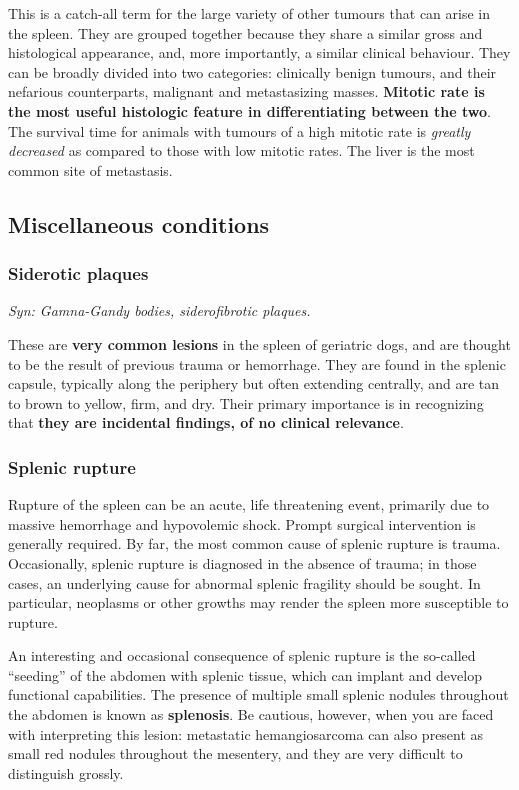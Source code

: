 \documentclass[openany]{article}
\begin{document}
This is a catch-all term for the large variety of other tumours that can
arise in the spleen. They are grouped together because they share a
similar gross and histological appearance, and, more importantly, a
similar clinical behaviour. They can be broadly divided into two
categories: clinically benign tumours, and their nefarious counterparts,
malignant and metastasizing masses. \textbf{Mitotic rate is the most
useful histologic feature in differentiating between the two}. The
survival time for animals with tumours of a high mitotic rate is
\emph{greatly decreased} as compared to those with low mitotic rates.
The liver is the most common site of metastasis.

\subsection{Miscellaneous conditions}\label{miscellaneous-conditions}

\subsubsection{Siderotic plaques}\label{siderotic-plaques}

\emph{Syn: Gamna-Gandy bodies, siderofibrotic plaques.}

These are \textbf{very common lesions} in the spleen of geriatric dogs,
and are thought to be the result of previous trauma or hemorrhage. They
are found in the splenic capsule, typically along the periphery but
often extending centrally, and are tan to brown to yellow, firm, and
dry. Their primary importance is in recognizing that \textbf{they are
incidental findings, of no clinical relevance}.

\subsubsection{Splenic rupture}\label{splenic-rupture}

Rupture of the spleen can be an acute, life threatening event, primarily
due to massive hemorrhage and hypovolemic shock. Prompt surgical
intervention is generally required. By far, the most common cause of
splenic rupture is trauma. Occasionally, splenic rupture is diagnosed in
the absence of trauma; in those cases, an underlying cause for abnormal
splenic fragility should be sought. In particular, neoplasms or other
growths may render the spleen more susceptible to rupture.

An interesting and occasional consequence of splenic rupture is the
so-called ``seeding'' of the abdomen with splenic tissue, which can
implant and develop functional capabilities. The presence of multiple
small splenic nodules throughout the abdomen is known as
\textbf{splenosis}. Be cautious, however, when you are faced with
interpreting this lesion: metastatic hemangiosarcoma can also present as
small red nodules throughout the mesentery, and they are very difficult
to distinguish grossly.
\end{document}
